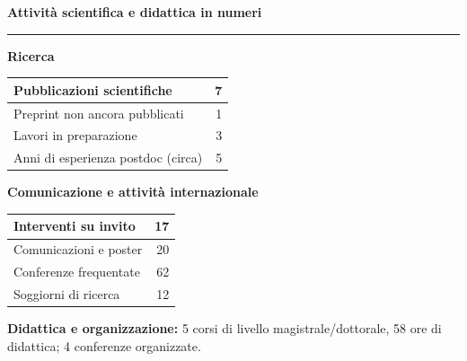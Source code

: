 \documentclass[10pt,a4paper]{article}
\newcommand{\cvsection}[1]{%
    \Needspace{4\baselineskip}%
    \vspace{0.8em}%
    {\large\bfseries\color{accent} #1}\par
    \vspace{0.2em}\hrule\vspace{0.45em}%
}
\begin{document}
\cvsection{Attività scientifica e didattica in numeri}
\begin{minipage}[t]{0.48\textwidth}
\textbf{Ricerca}\par\vspace{3pt}
\begin{tabularx}{\linewidth}{|>{\raggedright\arraybackslash}X|r|}
\hline
Pubblicazioni scientifiche & 7 \\ \hline
Preprint non ancora pubblicati & 1 \\ \hline
Lavori in preparazione & 3 \\ \hline
Anni di esperienza postdoc (circa) & 5 \\ \hline
\end{tabularx}
\end{minipage}\hfill
\begin{minipage}[t]{0.48\textwidth}
\textbf{Comunicazione e attività internazionale}\par\vspace{3pt}
\begin{tabularx}{\linewidth}{|>{\raggedright\arraybackslash}X|r|}
\hline
Interventi su invito & 17 \\ \hline
Comunicazioni e poster & 20 \\ \hline
Conferenze frequentate & 62 \\ \hline
Soggiorni di ricerca & 12 \\ \hline
\end{tabularx}
\end{minipage}
\par\vspace{5pt}
\textbf{Didattica e organizzazione:} 5 corsi di livello magistrale/dottorale, 58 ore di didattica; 4 conferenze organizzate.
\end{document}
